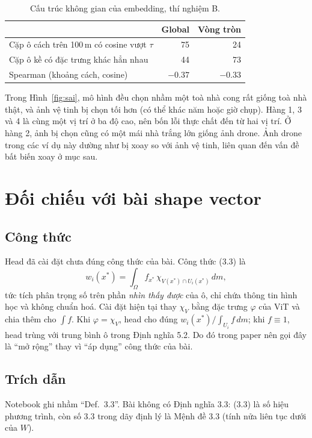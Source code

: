 \documentclass[11pt,a4paper]{article}
\begin{document}
\begin{table}[H]\centering\small
\caption{Cấu trúc không gian của embedding, thí nghiệm B.}\label{tab:hexbin}
\begin{tabular}{@{}lrr@{}}\toprule
& Global & Vòng tròn\\\midrule
Cặp ô cách trên 100\,m có cosine vượt $\tau$ & 75 & 24\\
Cặp ô kề có đặc trưng khác hẳn nhau & 44 & 73\\
Spearman (khoảng cách, cosine) & $-0.37$ & $-0.33$\\\bottomrule
\end{tabular}
\end{table}

Trong Hình~\ref{fig:sai}, mô hình đều chọn nhầm một toà nhà cong rất giống toà nhà thật, và ảnh vệ tinh bị chọn tối hơn (có thể khác năm hoặc giờ chụp). Hàng 1, 3 và 4 là cùng một vị trí ở ba độ cao, nên bốn lỗi thực chất đến từ hai vị trí. Ở hàng 2, ảnh bị chọn cũng có một mái nhà trắng lớn giống ảnh drone. Ảnh drone trong các ví dụ này dường như bị xoay so với ảnh vệ tinh, liên quan đến vấn đề bất biến xoay ở mục sau.

\section{Đối chiếu với bài shape vector}\label{sec:doichieu}

\subsection{Công thức}
Head đã cài đặt chưa đúng công thức của bài. Công thức (3.3) là
\[
w_i(x^*)=\int_\Omega f_{x^*}\,\chi_{V(x^*)\cap U_i(x^*)}\,dm,
\]
tức tích phân trọng số trên phần \emph{nhìn thấy được} của ô, chỉ chứa thông tin hình học và không chuẩn hoá. Cài đặt hiện tại thay $\chi_V$ bằng đặc trưng $\varphi$ của ViT và chia thêm cho $\int f$. Khi $\varphi=\chi_V$, head cho đúng $w_i(x^*)/\int_{U_i}f\,dm$; khi $f\equiv1$, head trùng với trung bình ô trong Định nghĩa 5.2. Do đó trong paper nên gọi đây là ``mở rộng'' thay vì ``áp dụng'' công thức của bài.

\subsection{Trích dẫn}
Notebook ghi nhầm ``Def.~3.3''. Bài không có Định nghĩa 3.3: (3.3) là số hiệu phương trình, còn số 3.3 trong dãy định lý là Mệnh đề 3.3 (tính nửa liên tục dưới của $W$).
\end{document}
